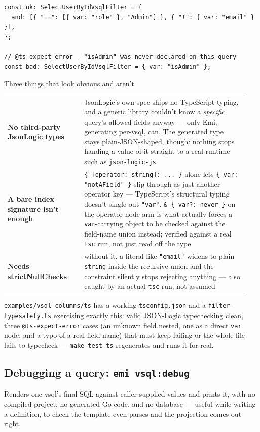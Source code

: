 \begin{lstlisting}
const ok: SelectUserByIdVsqlFilter = {
  and: [{ "==": [{ var: "role" }, "Admin"] }, { "!": { var: "email" } }],
};

// @ts-expect-error - "isAdmin" was never declared on this query
const bad: SelectUserByIdVsqlFilter = { var: "isAdmin" };
\end{lstlisting}

\begin{sidebar}{Three things that look obvious and aren't}
\small
\begin{tabular}{@{}p{0.3\linewidth}p{0.64\linewidth}@{}}
\textbf{No third-party JsonLogic types} & JsonLogic's own spec ships no TypeScript typing, and a generic library couldn't know a \emph{specific} query's allowed fields anyway --- only Emi, generating per-vsql, can. The generated type stays plain-JSON-shaped, though: nothing stops handing a value of it straight to a real runtime such as \texttt{json-logic-js} \\
\textbf{A bare index signature isn't enough} & \texttt{\{ [operator: string]: ... \}} alone lets \texttt{\{ var: "notAField" \}} slip through as just another operator key --- TypeScript's structural typing doesn't single out \texttt{"var"}. \texttt{\& \{ var?: never \}} on the operator-node arm is what actually forces a \texttt{var}-carrying object to be checked against the field-name union instead; verified against a real \texttt{tsc} run, not just read off the type \\
\textbf{Needs strictNullChecks} & without it, a literal like \texttt{"email"} widens to plain \texttt{string} inside the recursive union and the constraint silently stops rejecting anything --- also caught by an actual \texttt{tsc} run, not assumed \\
\end{tabular}
\end{sidebar}

\texttt{examples/vsql-columns/ts} has a working \texttt{tsconfig.json}
and a \texttt{filter-typesafety.ts} exercising exactly this: valid
JSON-Logic typechecking clean, three \texttt{@ts-expect-error} cases
(an unknown field nested, one as a direct \texttt{var} node, and a
typo of a real field name) that must keep failing or the whole file
fails to typecheck --- \texttt{make test-ts} regenerates and runs it
for real.

\subsection{Debugging a query: \texttt{emi vsql:debug}}
Renders one vsql's final SQL against caller-supplied values and
prints it, with no compiled project, no generated Go code, and no
database --- useful while writing a definition, to check the template
even parses and the projection comes out right.

